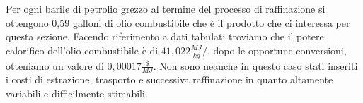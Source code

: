 Per ogni barile di petrolio grezzo al termine del processo di raffinazione si ottengono 0,59 galloni di olio combustibile che è il prodotto che ci interessa per questa sezione.
Facendo riferimento a dati tabulati troviamo che il potere calorifico dell'olio combustibile è di $41,022 \frac{MJ}{kg}/$, dopo le opportune conversioni, otteniamo un valore di $0,00017\frac{\$}{MJ}$.
Non sono neanche in questo caso stati inseriti i costi di estrazione, trasporto e successiva raffinazione in quanto altamente variabili e difficilmente stimabili.